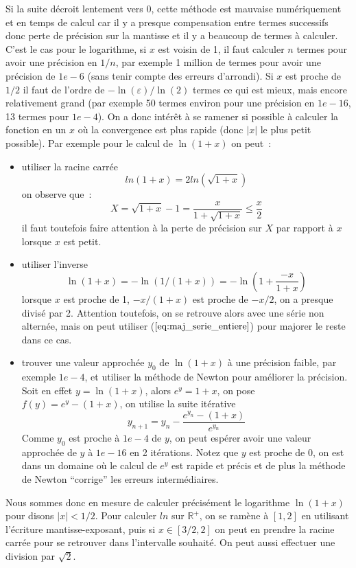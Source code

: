 \documentclass[a4paper,11pt]{article}
\begin{document}
\begin{giacjshere}
Si la suite d\'ecroit lentement vers 0, cette m\'ethode est
mauvaise num\'eriquement et en temps de calcul
car il y a presque compensation entre
termes successifs donc perte de pr\'ecision sur la mantisse et il
y a beaucoup de termes \`a calculer. C'est le cas pour le logarithme,
si $x$ est voisin de 1, il faut calculer $n$ termes pour avoir une
pr\'ecision en $1/n$, par exemple 1 million de termes pour avoir
une pr\'ecision de $1e-6$ (sans tenir compte des erreurs d'arrondi). 
Si $x$ est proche de $1/2$ il faut de l'ordre
de $-\ln(\varepsilon)/\ln(2)$ termes ce qui est mieux, mais encore
relativement grand (par exemple
50 termes environ pour une pr\'ecision en $1e-16$,
13 termes pour $1e-4$).
On a donc int\'er\^et \`a se
ramener si possible \`a calculer la fonction en un $x$ o\`u la
convergence est plus rapide (donc $|x|$ le plus petit possible).
Par exemple pour le calcul de $\ln(1+x)$ on peut~:
\begin{itemize}
\item utiliser la racine carr\'ee
\[ ln(1+x)= 2 ln(\sqrt{1+x})\]
on observe que~:
\[ X=\sqrt{1+x}-1 = \frac{x}{1+\sqrt{1+x}} \leq \frac{x}{2} \]
il faut toutefois faire attention \`a la perte de pr\'ecision sur
$X$ par rapport \`a $x$ lorsque $x$ est petit.
\item utiliser l'inverse
\[ \ln(1+x)=-\ln(1/(1+x))=-\ln(1 + \frac{-x}{1+x}) \]
lorsque $x$ est proche de 1, $-x/(1+x)$ est proche de $-x/2$, on
a presque divis\'e par 2. Attention toutefois, on se retrouve alors
avec une s\'erie non altern\'ee, mais on peut utiliser 
(\(\ref{eq:maj_serie_entiere}\)) pour majorer le reste dans ce cas.
\item trouver une valeur approch\'ee $y_0$ de $\ln(1+x)$ \`a une pr\'ecision
faible, par exemple $1e-4$, et utiliser la m\'ethode de Newton pour
am\'eliorer la pr\'ecision. Soit en effet $y=\ln(1+x)$, alors
$e^y=1+x$, on pose $f(y)=e^y-(1+x)$, on utilise la suite it\'erative
\[ y_{n+1} = y_n - \frac{e^{y_n}-(1+x)}{e^{y_n}}  \]
Comme $y_0$ est proche \`a $1e-4$ de $y$, on peut esp\'erer avoir
une valeur approch\'ee de $y$ \`a $1e-16$ en 2 it\'erations. Notez
que $y$ est proche de $0$, on est dans un domaine o\`u le calcul
de $e^y$ est rapide et pr\'ecis et de plus la m\'ethode de Newton
``corrige'' les erreurs interm\'ediaires.
\end{itemize}

Nous sommes donc en mesure de calculer pr\'ecis\'ement le logarithme
$\ln(1+x)$ pour disons $|x|<1/2$. Pour calculer $ln$ sur $\mathbb{R}^+$,
on se ram\`ene \`a $[1,2]$ en utilisant l'\'ecriture
mantisse-exposant, puis si $x\in[3/2,2]$ on peut en prendre la racine
carr\'ee pour se retrouver dans l'intervalle souhait\'e.
On peut aussi effectuer une division par $\sqrt{2}$.


\end{giacjshere}
\end{document}
